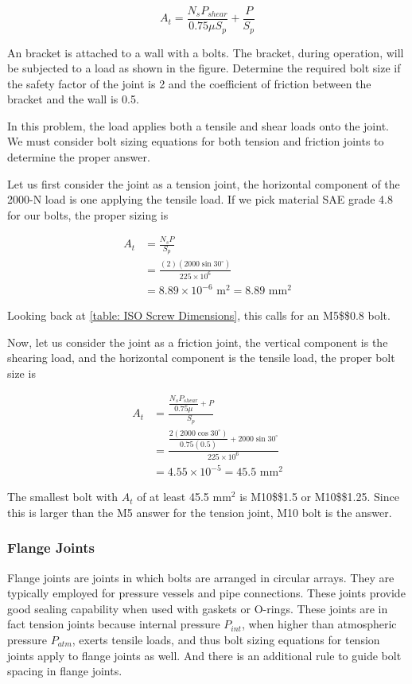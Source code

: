 \documentclass[a4paper,openany,nobib]{tufte-book}
\begin{document}
{{$$A_t = \frac{N_s P_{shear}}{0.75\mu S_p } + \frac{P}{S_p}$$

An bracket is attached to a wall with a bolts. The bracket, during
operation, will be subjected to a load as shown in the figure. Determine
the required bolt size if the safety factor of the joint is 2 and the
coefficient of friction between the bracket and the wall is 0.5.


In this problem, the load applies both a tensile and shear loads onto
the joint. We must consider bolt sizing equations for both tension and
friction joints to determine the proper answer.

Let us first consider the joint as a tension joint, the horizontal
component of the 2000-N load is one applying the tensile load. If we
pick material SAE grade 4.8 for our bolts, the proper sizing is

$$\begin{aligned}
    A_t &= \frac{N_s P}{S_p} \\
        &= \frac{(2)(2000 \sin 30^{\circ})}{225 \times 10^6} \\
        &= 8.89 \times 10^{-6} \text{ m}^2 = 8.89 \text{ mm}^2
  \end{aligned}$$

Looking back at \ref{table: ISO Screw Dimensions}, this
calls for an M5\$\texttimes{}\$0.8 bolt.

Now, let us consider the joint as a friction joint, the vertical
component is the shearing load, and the horizontal component is the
tensile load, the proper bolt size is

$$\begin{aligned}
    A_t &= \frac{\dfrac{N_s P_{shear}}{0.75\mu } + P}{S_p} \\
        &= \frac{\dfrac{2(2000 \cos 30^{\circ})}{0.75(0.5)} + 2000 \sin 30^{\circ}}{225 \times 10^6} \\
        &= 4.55 \times 10^{-5} = 45.5 \text{ mm}^2
  \end{aligned}$$

The smallest bolt with \(A_t\) of at least 45.5 mm\(^2\) is M10\$\texttimes{}\$1.5
or M10\$\texttimes{}\$1.25. Since this is larger than the M5 answer for the
tension joint, M10 bolt is the answer.

\subsubsection{Flange Joints}
\label{flange-joints}
Flange joints are joints in which bolts are arranged in circular arrays.
They are typically employed for pressure vessels and pipe connections.
These joints provide good sealing capability when used with gaskets or
O-rings. These joints are in fact tension joints because internal
pressure \(P_{int}\), when higher than atmospheric pressure \(P_{atm}\),
exerts tensile loads, and thus bolt sizing equations for tension joints
apply to flange joints as well. And there is an additional rule to guide
bolt spacing in flange joints.


}}
\end{document}
